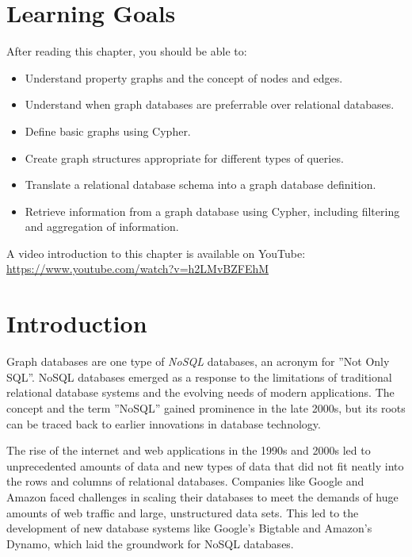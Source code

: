 %
%
\section*{Learning Goals}

After reading this chapter, you should be able to:
\begin{itemize}
   \item Understand property graphs and the concept of nodes and edges.
   \item Understand when graph databases are preferrable over relational databases.
   \item Define basic graphs using Cypher.
   \item Create graph structures appropriate for different types of queries. 
   \item Translate a relational database schema into a graph database definition.
   \item Retrieve information from a graph database using Cypher, including filtering and aggregation of information.
\end{itemize}


\begin{advanced}
\begin{videobox}
A video introduction to this chapter is available on YouTube:\\

\url{https://www.youtube.com/watch?v=h2LMvBZFEhM}
\end{videobox}
\end{advanced}

\section{Introduction}

Graph databases are one type of \emph{NoSQL} databases, an acronym for ''Not Only SQL''. NoSQL databases emerged as a response to the limitations of traditional relational database systems and the evolving needs of modern applications. The concept and the term ''NoSQL'' gained prominence in the late 2000s, but its roots can be traced back to earlier innovations in database technology.

The rise of the internet and web applications in the 1990s and 2000s led to unprecedented amounts of data and new types of data that did not fit neatly into the rows and columns of relational databases. Companies like Google and Amazon faced challenges in scaling their databases to meet the demands of huge amounts of web traffic and large, unstructured data sets. This led to the development of new database systems like Google's Bigtable and Amazon's Dynamo, which laid the groundwork for NoSQL databases.

